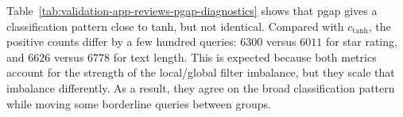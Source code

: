 Table~\ref{tab:validation-app-reviews-pgap-diagnostics} shows that pgap gives a classification pattern close to tanh, but not identical.
Compared with \(c_{\mathrm{tanh}}\), the positive counts differ by a few hundred queries: \(6300\) versus \(6011\) for star rating, and \(6626\) versus \(6778\) for text length.
This is expected because both metrics account for the strength of the local/global filter imbalance, but they scale that imbalance differently.
As a result, they agree on the broad classification pattern while moving some borderline queries between groups.

\begin{table}[!htbp]
    \centering
    \renewcommand{\arraystretch}{1.12}
    \caption{Planner diagnostics for \(c_{\mathrm{pgap}}\) on the app review validation sets.}
    \label{tab:validation-app-reviews-pgap-diagnostics}
\end{table}